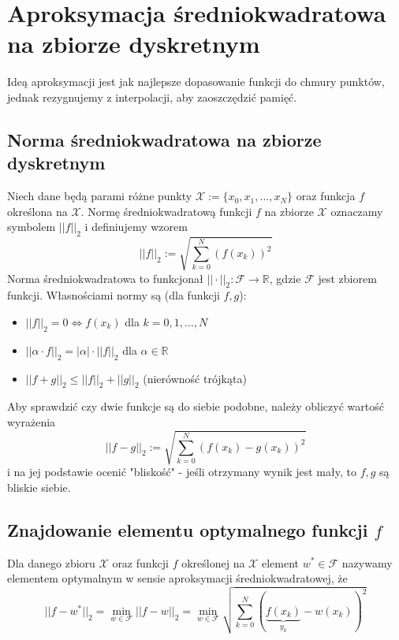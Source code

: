 \documentclass[a4paper,11pt]{article}
\begin{document}
\newpage
\section{Aproksymacja średniokwadratowa na zbiorze dyskretnym}
Ideą aproksymacji jest jak najlepsze dopasowanie funkcji do chmury punktów, jednak rezygnujemy z interpolacji, aby zaoszczędzić pamięć.

\subsection{Norma średniokwadratowa na zbiorze dyskretnym}
Niech dane będą parami różne punkty $\mathcal{X}:=\{x_0, x_1, \ldots, x_N\}$ oraz funkcja $f$ określona na $\mathcal{X}$. Normę średniokwadratową funkcji $f$ na zbiorze $\mathcal{X}$ oznaczamy symbolem $||f||_2$ i definiujemy wzorem
$$ ||f||_2 := \sqrt{\sum\limits_{k=0}^{N} \left( f(x_k) \right)^{2}} $$
Norma średniokwadratowa to funkcjonał $||\cdot||_2: \mathcal{F}\to \mathbb{R}$, gdzie $\mathcal{F}$ jest zbiorem funkcji. Własnościami normy są (dla funkcji $f, g$):
\begin{itemize}
\item $||f||_2 = 0 \Leftrightarrow f(x_k)$ dla $k=0,1,\ldots, N$
\item $||\alpha\cdot f||_2 = |\alpha| \cdot ||f||_2$ dla $\alpha \in \mathbb{R}$
\item $||f+g||_2 \leq ||f||_2 + ||g||_2$ (nierówność trójkąta)
\end{itemize}

\noindent Aby sprawdzić czy dwie funkcje są do siebie podobne, należy obliczyć wartość wyrażenia
$$ ||f-g||_2 := \sqrt{\sum\limits_{k=0}^{N} \left( f(x_k)-g(x_k) \right)^{2}} $$
i na jej podstawie ocenić "bliskość" - jeśli otrzymany wynik jest mały, to $f, g$ są bliskie siebie.

\subsection{Znajdowanie elementu optymalnego funkcji $f$}
Dla danego zbioru $\mathcal{X}$ oraz funkcji $f$ określonej na $\mathcal{X}$ element $w^*\in\mathcal{F}$ nazywamy elementem optymalnym w sensie aproksymacji średniokwadratowej, że 
$$ ||f-w^*||_2 = \min\limits_{w\in\mathcal{F}}^{} ||f-w||_2  = \min\limits_{w\in\mathcal{F}}^{} \sqrt{\sum\limits_{k=0}^{N} \left( \underbrace{f(x_k)}_{y_k}-w(x_k) \right)^{2}} $$
\end{document}
